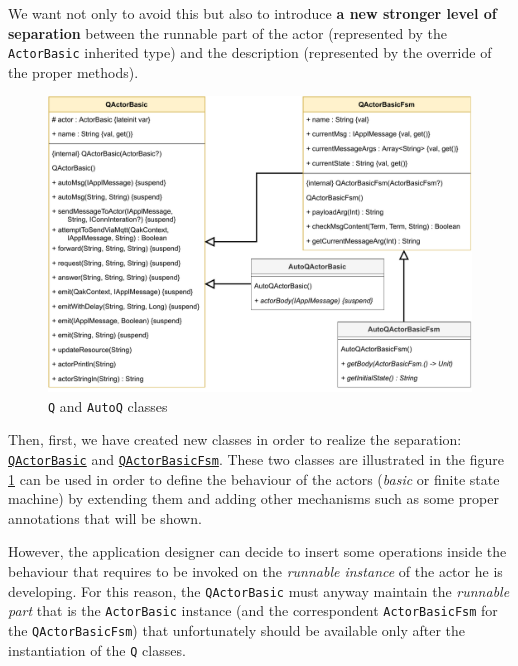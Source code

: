 We want not only to avoid this but also to introduce \textbf{a new stronger level of separation} between the runnable part of the actor (represented by the \texttt{ActorBasic} inherited type) and the description (represented by the override of the proper methods).

\begin{figure}[h]
	\centering
	\includegraphics[width=\textwidth]{img/[UML]QActorBasic_QActorBasicFsm_Auto}
	\caption{\texttt{Q} and \texttt{AutoQ} classes}
	\label{fig::q_autoq_classes}
\end{figure}

Then, first, we have created new classes in order to realize the separation: \href{https://github.com/LM-96/QA-Extensions/blob/main/it.unibo.qakactor/src/main/kotlin/QActorBasic.kt}{\texttt{QActorBasic}} and \href{https://github.com/LM-96/QA-Extensions/blob/main/it.unibo.qakactor/src/main/kotlin/QActorBasicFsm.kt}{\texttt{QActorBasicFsm}}. These two classes are illustrated in the figure \ref{fig::q_autoq_classes} can be used in order to define the behaviour of the actors (\textit{basic} or finite state machine) by extending them and adding other mechanisms such as some proper annotations that will be shown.

However, the application designer can decide to insert some operations inside the behaviour that requires to be invoked on the \textit{runnable instance} of the actor he is developing. For this reason, the \texttt{QActorBasic} must anyway maintain the \textit{runnable part} that is the \texttt{ActorBasic} instance (and the correspondent \texttt{ActorBasicFsm} for the \texttt{QActorBasicFsm}) that unfortunately should be available only after the instantiation of the \texttt{Q} classes.

